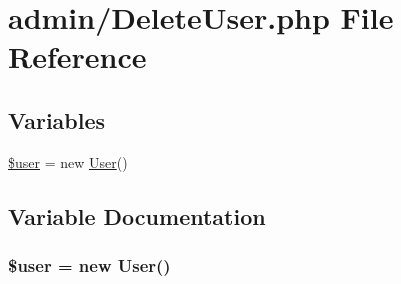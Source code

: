 \hypertarget{_delete_user_8php}{}\section{admin/\+Delete\+User.php File Reference}
\label{_delete_user_8php}
\subsection*{Variables}
\begin{DoxyCompactItemize}
\item 
\hyperlink{_delete_user_8php_a598ca4e71b15a1313ec95f0df1027ca5}{\$user} = new \hyperlink{class_user}{User}()
\end{DoxyCompactItemize}


\subsection{Variable Documentation}
\subsubsection[{\texorpdfstring{\$user}{$user}}]{\setlength{\rightskip}{0pt plus 5cm}\$user = new {\bf User}()}\hypertarget{_delete_user_8php_a598ca4e71b15a1313ec95f0df1027ca5}{}\label{_delete_user_8php_a598ca4e71b15a1313ec95f0df1027ca5}
